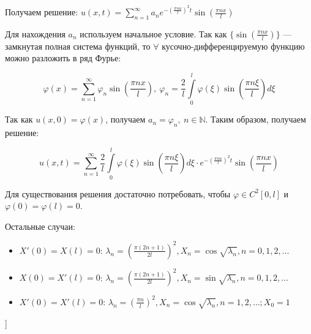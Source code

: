 \bigbreak
Получаем решение: $u(x,t)=\displaystyle\sum_{n=1}^{\infty} a_n e^{-(\frac{\pi n a}{l})^2t} \sin(\frac{\pi n x}{l})$

Для нахождения $a_n$ используем начальное условие.
Так как $\{\sin(\frac{\pi n x}{l})\}$ --- замкнутая полная система функций, то $\forall$ кусочно-дифференцируемую функцию можно разложить в ряд Фурье:

$$\varphi(x) = \displaystyle\sum_{n=1}^{\infty} \varphi_n \sin(\frac{\pi n x}{l}),~\varphi_n=\frac{2}{l}\int\limits_0^l\varphi(\xi)\sin(\frac{\pi n \xi}{l})d\xi$$

Так как $u(x,0) = \varphi(x)$, получаем $a_n = \varphi_n,~n\in\mathbb{N}$. Таким образом, получаем решение:

$$u(x,t)=
\displaystyle\sum_{n=1}^{\infty} \frac{2}{l}\int\limits_0^l\varphi(\xi)\sin \left( \frac{\pi n \xi}{l} \right)d\xi \cdot e^{-(\frac{\pi n a}{l})^2t} \sin \left(\frac{\pi n x}{l} \right)$$

\bigbreak
Для существования решения достаточно потребовать, чтобы $\varphi\in C^2[0,l]$ и $\varphi(0)=\varphi(l)=0$.

\bigbreak
Остальные случаи:
\begin{itemize}
    \item $X'(0)=X(l)=0$: $\lambda_n=\left(\frac{\pi(2n+1)}{2l}\right)^2, X_n=\cos\sqrt{\lambda_n}, n=0,1,2,\dots$ \\
    \item $X(0)=X'(l)=0$: $\lambda_n=\left(\frac{\pi(2n+1)}{2l}\right)^2, X_n=\sin\sqrt{\lambda_n}, n=0,1,2,\dots$ \\
    \item $X'(0)=X'(l)=0$: $\lambda_n=\left(\frac{\pi n}{l}\right)^2, X_n=\cos\sqrt{\lambda_n}, n=1,2,\dots; X_0=1$ \\
\end{itemize}

\bigbreak
[\cite[page 200-202]{urmati_tikhonov}]
